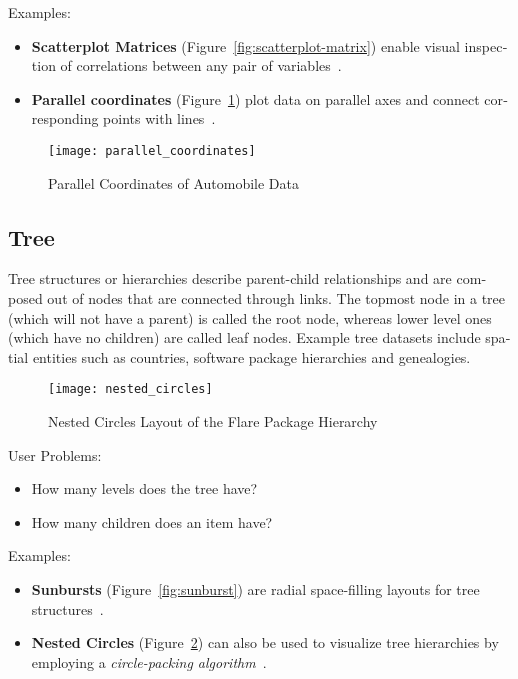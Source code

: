 \begin{english}
\SuperPar Examples:

\begin{itemize}
\item \textbf{Scatterplot Matrices} (Figure~\ref{fig:scatterplot-matrix}) enable visual inspection of correlations between any pair of variables~\cite{VisualizationZoo:2010}.
\item \textbf{Parallel coordinates} (Figure~\ref{fig:parallel-coordinates}) plot data on parallel axes and connect corresponding points with lines~\cite{VisualizationZoo:2010}. 
\end{itemize}


\begin{figure}
\centering
\texttt{[image: parallel\_coordinates]}
\caption{Parallel Coordinates of Automobile Data}
\label{fig:parallel-coordinates}
\end{figure}

\subsection{Tree}

Tree structures or hierarchies describe parent-child relationships and are composed out of nodes that are connected through links. The topmost node in a tree (which will not have a parent) is called the root node, whereas lower level ones (which have no children) are called leaf nodes. Example tree datasets include spatial entities such as countries, software package hierarchies and genealogies.

\begin{figure}
\centering
\texttt{[image: nested\_circles]}
\caption{Nested Circles Layout of the Flare Package Hierarchy}
\label{fig:nested_circles}
\end{figure}


\SuperPar User Problems:

\begin{itemize}
\item How many levels does the tree have?
\item How many children does an item have?
\end{itemize}


\SuperPar Examples:

\begin{itemize}
\item \textbf{Sunbursts} (Figure~\ref{fig:sunburst}) are radial space-filling layouts for tree structures~\cite{VisualizationZoo:2010}.
\item \textbf{Nested Circles} (Figure~\ref{fig:nested_circles}) can also be used to visualize tree hierarchies by employing a \emph{circle-packing algorithm}~\cite{VisualizationZoo:2010}.
\end{itemize}


\end{english}
